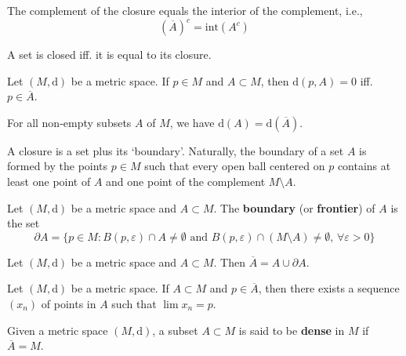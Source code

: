 \begin{proposition}
    The complement of the closure equals the interior of the complement, i.e.,
    \[
        (\overline{A})^c = \text{int}(A^c)
    \]
\end{proposition}

\begin{corollary}
    A set is closed iff. it is equal to its closure.
\end{corollary}

\begin{proposition}
    Let $(M, \mathrm{d})$ be a metric space. If $p \in M$ and $A \subset M$, then $\mathrm{d}(p, A) = 0$ iff. $p \in \overline{A}$.
\end{proposition}

\begin{proposition}
    For all non-empty subsets $A$ of $M$, we have $\mathrm{d}(A) = \mathrm{d}(\overline{A})$.
\end{proposition}

A closure is a set plus its `boundary'. Naturally, the boundary of a set $A$ is formed by the points $p \in M$ such that every open ball centered on $p$ contains at least one point of $A$ and one point of the complement $M \setminus A$.

\begin{definition}[Boundary]
    Let $(M, \mathrm{d})$ be a metric space and $A \subset M$. The \textbf{boundary} (or \textbf{frontier}) of $A$ is the set
    \[
        \partial A = \{ p \in M : B(p, \varepsilon) \cap A \neq \emptyset \text{ and } B(p, \varepsilon) \cap (M \setminus A) \neq \emptyset, \, \forall \varepsilon > 0 \}
    \]
\end{definition}

\begin{proposition}
    Let $(M, \mathrm{d})$ be a metric space and $A \subset M$. Then $\overline{A} = A \cup \partial A$.
\end{proposition}

\begin{proposition}
    Let $(M, \mathrm{d})$ be a metric space. If $A \subset M$ and $p \in \overline{A}$, then there exists a sequence $(x_n)$ of points in $A$ such that $\lim x_n = p$.
\end{proposition}

\begin{definition}[Dense]
    Given a metric space $(M, \mathrm{d})$, a subset $A \subset M$ is said to be \textbf{dense} in $M$ if $\overline{A} = M$.
\end{definition}

